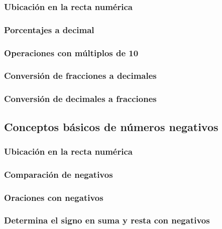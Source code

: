 \documentclass[12pt,repaso,answers]{RDS_unit}
\begin{document}
\begin{questions}
	\subsubsection{Ubicación en la recta numérica}
	\question[1]{}
	\subsubsection{Porcentajes a decimal}
	\question[1]{}
	\subsubsection{Operaciones con múltiplos de 10}
	\question[1]{}
	\subsubsection{Conversión de fracciones a decimales}
	\question[1]{}
	\subsubsection{Conversión de decimales a fracciones}
	\question[1]{}

	\subsection   {Conceptos básicos de números negativos}
	\subsubsection{Ubicación en la recta numérica}
	\question[1]{}
	\subsubsection{Comparación de negativos}
	\question[1]{}
	\subsubsection{Oraciones con negativos}
	\question[1]{}
	\subsubsection{Determina el signo en suma y resta con negativos}
	\question[1]{}

\end{questions}
\end{document}
